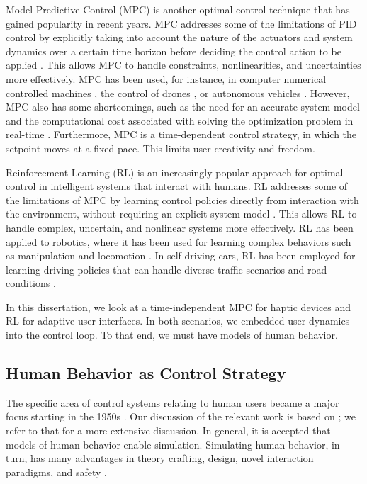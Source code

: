 Model Predictive Control (MPC) is another optimal control technique that has gained popularity in recent years. MPC addresses some of the limitations of PID control by explicitly taking into account the nature of the actuators and system dynamics over a certain time horizon before deciding the control action to be applied \cite{dasilva:2008:mpc, qin1997overview}. This allows MPC to handle constraints, nonlinearities, and uncertainties more effectively. MPC has been used, for instance, in computer numerical controlled machines \cite{lam2010model, lam2013model}, the control of drones \cite{Gebhardt:2018}, or autonomous vehicles \cite{liu2017path}. However, MPC also has some shortcomings, such as the need for an accurate system model and the computational cost associated with solving the optimization problem in real-time \cite{holkar2010overview}. Furthermore, MPC is a time-dependent control strategy, in which the setpoint moves at a fixed pace. This limits user creativity and freedom.

Reinforcement Learning (RL) is an increasingly popular approach for optimal control in intelligent systems that interact with humans. RL addresses some of the limitations of MPC by learning control policies directly from interaction with the environment, without requiring an explicit system model \cite{sutton1998introduction}. This allows RL to handle complex, uncertain, and nonlinear systems more effectively. RL has been applied to robotics, where it has been used for learning complex behaviors such as manipulation and locomotion \cite{christen2019guided, christen2023synh2r}. In self-driving cars, RL has been employed for learning driving policies that can handle diverse traffic scenarios and road conditions \cite{kiran2021deep}.

In this dissertation, we look at a time-independent MPC for haptic devices and RL for adaptive user interfaces. In both scenarios, we embedded user dynamics into the control loop. To that end, we must have models of human behavior.

\subsection{Human Behavior as Control Strategy}
The specific area of control systems relating to human users became a major focus starting in the 1950s \cite{McRuer1967, Costello1968}. Our discussion of the relevant work is based on \cite{murray2018control}; we refer to that for a more extensive discussion. In general, it is accepted that models of human behavior enable simulation. Simulating human behavior, in turn, has many advantages in theory crafting, design, novel interaction paradigms, and safety \cite{murray2022simulation}.

